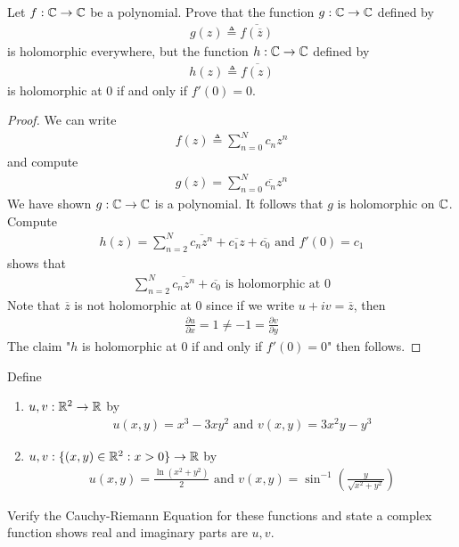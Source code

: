 \documentclass{report}
\begin{document}
\begin{question}{}{}
Let $f:\mathbb{C}\rightarrow \mathbb{C}$ be a polynomial. Prove that the function $g:\mathbb{C}\rightarrow \mathbb{C}$ defined by  
\begin{align*}
g(z)\triangleq \overline{f(\overline{z})}
\end{align*}
is holomorphic everywhere, but the function $h:\mathbb{C}\rightarrow \mathbb{C}$ defined by 
\begin{align*}
h(z)\triangleq \overline{f(z)}
\end{align*}
is holomorphic at $0$ if and only if $f'(0)=0$.
\end{question}
\begin{proof}
We can write 
\begin{align*}
f(z)\triangleq \sum_{n=0}^N c_n z^n
\end{align*}
and compute 
\begin{align*}
g(z)= \sum_{n=0}^N \overline{c_n}z^n
\end{align*}
We have shown $g:\mathbb{C}\rightarrow \mathbb{C}$ is a polynomial. It follows that $g$ is holomorphic on $\mathbb{C}$. Compute 
\begin{align*}
h(z)=\sum_{n=2}^N \overline{c_nz^n}+\overline{c_1z}+\overline{c_0}\text{ and }f'(0)=c_1
\end{align*}
 shows that 
\begin{align*}
\sum_{n=2}^N \overline{c_nz^n}+\overline{c_0}\text{ is holomorphic at }0
\end{align*}
Note that $\overline{z}$ is not holomorphic at $0$ since if we write  $u+iv=\overline{z}$, then 
\begin{align*}
\frac{\partial u}{\partial x}=1\neq -1=\frac{\partial v}{\partial y}
\end{align*}
The claim "$h$ is holomorphic at  $0$ if and only if  $f'(0)=0$" then follows. 
\end{proof}
\begin{question}{}{}
Define 
\begin{enumerate}[label=(\alph*)]
  \item $u,v:\mathbb{R}^2\rightarrow \mathbb{R}$ by 
    \begin{align*}
    u(x,y)=x^3-3xy^2\text{ and }v(x,y)=3x^2y-y^3
    \end{align*} 
    \item $u,v: \{ (x,y)\in\mathbb{R}^2:x>0 \}\rightarrow \mathbb{R}$ by 
      \begin{align*}
      u(x,y)= \frac{\ln (x^2+y^2)}{2}\text{ and }v(x,y)= \sin^{-1}(\frac{y}{\sqrt{x^2+y^2}})
      \end{align*}
\end{enumerate}
Verify the Cauchy-Riemann Equation for these functions and state a complex function shows real and imaginary parts are $u,v$. 
\end{question}
\end{document}
